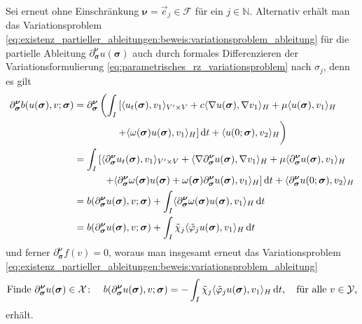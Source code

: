 \begin{Bemerkung}
\label{bemerkung:alternative_herleitung_variationsproblem_ableitung}
    Sei erneut ohne Einschränkung $\bm\nu = \vec e_{j} \in \mathcal{F}$ für ein $j \in \mathbb{N}$.
    Alternativ erhält man das Variationsproblem \cref{eq:existenz_partieller_ableitungen:beweis:variationsproblem_ableitung} für die partielle Ableitung $\partial^{\bm\nu}_{\bm\sigma} u(\bm\sigma)$ auch durch formales Differenzieren der Variationsformulierung \cref{eq:parametrisches_rz_variationsproblem} nach $\sigma_{j}$, denn es gilt
    \begin{align}
        \partial^{\bm\nu}_{\bm\sigma} b(u(\bm\sigma), v; \bm\sigma)
        &= \partial^{\bm\nu}_{\bm\sigma} \left( \int_{I} \left[ \skp{u_{t}(\bm\sigma)}{v_{1}}{V' \times V} + c \skp{\grad u(\bm\sigma)}{\grad v_{1}}{H} + \mu \skp{u(\bm\sigma)}{v_{1}}{H} \right.\right.
        \\&\qquad\qquad \left.\vphantom{\int_{I}}\left. + \skp{\omega(\bm\sigma) u(\bm\sigma)}{v_{1}}{H} \right] \diff t + \skp{u(0; \bm\sigma)}{v_{2}}{H} \right)
        \\&= \int_{I} \left[ \skp{\partial^{\bm\nu}_{\bm\sigma} u_{t}(\bm\sigma)}{v_{1}}{V' \times V}
            + \skp{\grad \partial^{\bm\nu}_{\bm\sigma} u(\bm\sigma)}{\grad v_{1}}{H} + \mu \skp{\partial^{\bm\nu}_{\bm\sigma} u(\bm\sigma)}{v_{1}}{H} \right.
        \\&\qquad \quad \left.+ \skp{\partial^{\bm\nu}_{\bm\sigma} \omega(\bm\sigma) u(\bm\sigma) + \omega(\bm\sigma) \partial^{\bm\nu}_{\bm\sigma} u(\bm\sigma)}{v_{1}}{H} \right] \diff t + \skp{\partial^{\bm\nu}_{\bm\sigma} u(0; \bm\sigma)}{v_{2}}{H}
        \\&= b(\partial^{\bm\nu}_{\bm\sigma} u(\bm\sigma), v; \bm\sigma) + \int_{I} \skp{\partial^{\bm\nu}_{\bm\sigma} \omega(\bm\sigma) u(\bm\sigma)}{v_{1}}{H} \diff t
        \\&= b(\partial^{\bm\nu}_{\bm\sigma} u(\bm\sigma), v; \bm\sigma) + \int_{I} \tilde{\chi}_{j} \skp{\tilde{\varphi}_{j} u(\bm\sigma)}{v_{1}}{H} \diff t
    \end{align}
    und ferner $\partial^{\bm\nu}_{\bm\sigma} f(v) = 0$, woraus man insgesamt erneut das Variationsproblem \cref{eq:existenz_partieller_ableitungen:beweis:variationsproblem_ableitung}
    \begin{equation}
        \text{Finde}~\partial^{\bm\nu}_{\bm\sigma} u(\bm\sigma) \in \mathcal X \colon \quad b(\partial^{\bm\nu}_{\bm\sigma} u(\bm\sigma), v; \bm\sigma) = - \int_{I} \tilde{\chi}_{j} \skp{\tilde{\varphi}_{j}  u(\bm\sigma)}{v_{1}}{H} \diff t, \quad \fa v \in \mathcal Y,
    \end{equation}
    erhält.
\end{Bemerkung}

